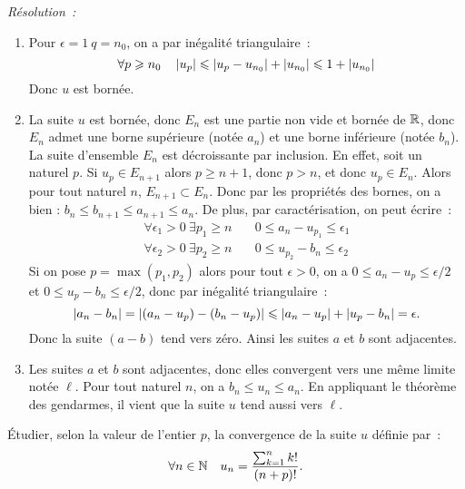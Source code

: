 \emph{Résolution~:}
\begin{enumerate}
    \item Pour \(\epsilon = 1 \ q = n_0\), on a par inégalité 
        triangulaire~:
        \[ \forall p \geqslant n_0 \quad \left\lvert u_p\right\rvert \leqslant \left\lvert u_p - 
        u_{n_0}\right\rvert + \left\lvert u_{n_0}\right\rvert \leqslant 1 + \left\lvert u_{n_0}\right\rvert\]
        Donc \(u\) est bornée.
    \item La suite \(u\) est bornée, donc \(E_n\) est une partie non vide 
        et bornée de \(\mathbb{R}\), donc \(E_n\) admet une borne supérieure (notée 
        \(a_n\)) et une borne inférieure (notée \(b_n\)). La suite 
        d'ensemble \(E_n\) est décroissante par inclusion. En effet, soit un 
        naturel \(p\). Si \(u_p \in E_{n+1}\) alors \(p \geqslant n+1\), 
        donc \(p > n\), et donc \(u_p \in E_n\). Alors pour tout naturel 
        \(n\), \(E_{n+1} \subset E_n\). Donc par les propriétés des bornes, 
        on a bien : \(b_n \leqslant b_{n+1} \leqslant a_{n+1} \leqslant 
        a_n\). De plus, par caractérisation, on peut écrire~:
        \begin{align*}
            \forall \epsilon_1 >0 \ \exists p_1 \geqslant n & \quad 0 
            \leqslant a_n - u_{p_1} \leqslant \epsilon_1 \\
            \forall \epsilon_2 >0 \ \exists p_2 \geqslant n & \quad 0 
            \leqslant u_{p_2} - b_n \leqslant \epsilon_2
        \end{align*}
        Si on pose \(p = \max(p_1,p_2)\) alors pour tout \(\epsilon>0\), on 
        a \(0 \leqslant a_n-u_p \leqslant \epsilon/2\) et \(0 \leqslant 
        u_p-b_n \leqslant \epsilon/2\), donc par inégalité triangulaire~:
        \[ \left\lvert a_n - b_n\right\rvert = \left\lvert(a_n-u_p) - (b_n-u_p)\right\rvert \leqslant 
        \left\lvert a_n-u_p\right\rvert + \left\lvert u_p-b_n\right\rvert = \epsilon. \]
        Donc la suite \((a-b)\) tend vers zéro. Ainsi les suites \(a\) et 
        \(b\) sont adjacentes.
    \item Les suites \(a\) et \(b\) sont adjacentes, donc elles convergent 
        vers une même limite notée \(\ell\). Pour tout naturel \(n\), on a 
        \(b_n \leqslant u_n \leqslant a_n\). En appliquant le théorème des 
        gendarmes, il vient que la suite \(u\) tend aussi vers \(\ell\).
\end{enumerate}
\begin{exercice}
    Étudier, selon la valeur de l'entier \(p\), la convergence de la suite 
    \(u\) définie par~: \[\forall n \in \mathbb{N} \quad u_n = \frac{\sum_{k = 
    1}^n k!}{(n+p)!}.\]
\end{exercice}

